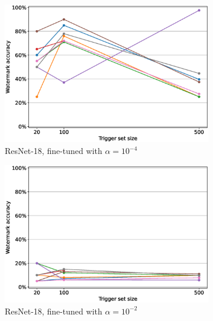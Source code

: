 \begin{figure}
\begin{subfigure}{0.41\linewidth}
        \includegraphics[width=\linewidth]{images/finetuning/resnet18_finetuning_per_arch_00001.eps}
        \caption{ResNet-18, fine-tuned with $\alpha=10^{-4}$}
        \label{fig:finetuning-smalllr-allmethods-perarch-resnet18}
    \end{subfigure}
    \quad
    \begin{subfigure}{0.41\linewidth}
        \includegraphics[width=\linewidth]{images/finetuning/resnet18_finetuning_per_arch_001.eps}
        \caption{ResNet-18, fine-tuned with $\alpha=10^{-2}$}
        \label{fig:finetuning-largelr-allmethods-perarch-resnet18}
    \end{subfigure}
    \quad
    \begin{subfigure}{0.41\linewidth}

\end{subfigure}
\end{figure}
